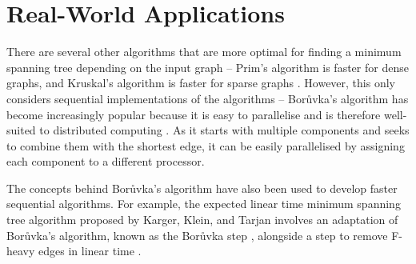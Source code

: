 \documentclass[a4paper, 11pt]{article}
\begin{document}
\section{Real-World Applications}
There are several other algorithms that are more optimal for finding a minimum spanning tree depending on the input graph -- Prim's algorithm is faster for dense graphs, and Kruskal's algorithm is faster for sparse graphs \cite{bazlamaccci2001minimum}. However, this only considers sequential implementations of the algorithms -- Borůvka's algorithm has become increasingly popular because it is easy to parallelise and is therefore well-suited to distributed computing \cite{mariano2015generic}. As it starts with multiple components and seeks to combine them with the shortest edge, it can be easily parallelised by assigning each component to a different processor.

The concepts behind Borůvka's algorithm have also been used to develop faster sequential algorithms. For example, the expected linear time minimum spanning tree algorithm proposed by Karger, Klein, and Tarjan involves an adaptation of Borůvka's algorithm, known as the Borůvka step \cite{dixon1992verification, king1995simpler}, alongside a step to remove F-heavy edges in linear time \cite{karger1995randomized}.

\newpage


\end{document}
